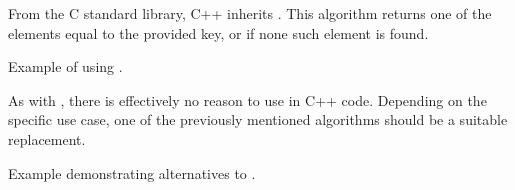 From the C standard library, C++ inherits . This algorithm returns one of the elements equal to the provided key, or  if none such element is found.

\begin{codebox}[]{\href{https://compiler-explorer.com/z/sEEashheY}{\ExternalLink}}
\footnotesize Example of using .
\tcblower
{}
\end{codebox}

As with , there is effectively no reason to use  in C++ code. Depending on the specific use case, one of the previously mentioned algorithms should be a suitable replacement.

\begin{codebox}[]{\href{https://compiler-explorer.com/z/9ePnd7vGc}{\ExternalLink}}
\footnotesize Example demonstrating alternatives to .
\tcblower
{}
\end{codebox}
